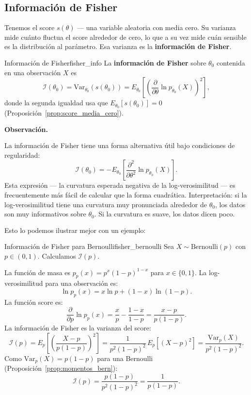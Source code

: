 \documentclass[12pt, a4paper]{book}
\newenvironment{observacion}{%
    \par\medskip\noindent\textbf{\color{azul}Observaci\'{o}n.}\enspace\itshape
}{\par\medskip}
\numberwithin{equation}{chapter}
\begin{document}
\subsection{Informaci\'{o}n de Fisher}

Tenemos el score $s(\theta)$ --- una variable aleatoria
con media cero. Su varianza mide cu\'{a}nto fluctua el
score alrededor de cero, lo que a su vez mide cu\'{a}n
sensible es la distribuci\'{o}n al par\'{a}metro. Esa
varianza es la \textbf{informaci\'{o}n de Fisher}.

\begin{definicion}{Informaci\'{o}n de Fisher}{fisher_info}
	La \textbf{informaci\'{o}n de Fisher} sobre $\theta_0$
	contenida en una observaci\'{o}n $X$ es
	\[
	\mathcal{I}(\theta_0) =
	\mathrm{Var}_{\theta_0}(s(\theta_0))
	= E_{\theta_0}\!\left[
	\left(\frac{\partial}{\partial\theta}
	\ln p_{\theta_0}(X)\right)^2\right],
	\]
	donde la segunda igualdad usa que
	$E_{\theta_0}[s(\theta_0)] = 0$
	(Proposici\'{o}n~\ref{prop:score_media_cero}).
\end{definicion}

\begin{observacion}
	La informaci\'{o}n de Fisher tiene una forma alternativa
	\'{u}til bajo condiciones de regularidad:
	\[
	\mathcal{I}(\theta_0) = -E_{\theta_0}\!\left[
	\frac{\partial^2}{\partial\theta^2}
	\ln p_{\theta_0}(X)\right].
	\]
	Esta expresi\'{o}n --- la curvatura esperada negativa
	de la log-verosimilitud --- es frecuentemente m\'{a}s
	f\'{a}cil de calcular que la forma cuadr\'{a}tica.
	Interpretaci\'{o}n: si la log-verosimilitud tiene una
	curvatura muy pronunciada alrededor de $\theta_0$,
	los datos son muy informativos sobre $\theta_0$. Si
	la curvatura es suave, los datos dicen poco.
\end{observacion}

Esto lo podemos ilustrar mejor con un ejemplo:

\begin{ejemplo}{Informaci\'{o}n de Fisher para
		Bernoulli}{fisher_bernoulli}
	Sea $X \sim \mathrm{Bernoulli}(p)$ con $p \in (0,1)$.
	Calculamos $\mathcal{I}(p)$.
	
	La funci\'{o}n de masa es $p_p(x) = p^x(1-p)^{1-x}$
	para $x \in \{0,1\}$. La log-verosimilitud para una
	observaci\'{o}n es:
	\[
	\ln p_p(x) = x\ln p + (1-x)\ln(1-p).
	\]
	La funci\'{o}n score es:
	\[
	\frac{\partial}{\partial p}\ln p_p(x)
	= \frac{x}{p} - \frac{1-x}{1-p}
	= \frac{x - p}{p(1-p)}.
	\]
	La informaci\'{o}n de Fisher es la varianza del score:
	\[
	\mathcal{I}(p)
	= E_p\!\left[\left(\frac{X-p}{p(1-p)}\right)^2\right]
	= \frac{1}{p^2(1-p)^2}\,E_p[(X-p)^2]
	= \frac{\mathrm{Var}_p(X)}{p^2(1-p)^2}.
	\]
	Como $\mathrm{Var}_p(X) = p(1-p)$ para una Bernoulli
	(Proposici\'{o}n~\ref{prop:momentos_bern}):
	\[
	\mathcal{I}(p) = \frac{p(1-p)}{p^2(1-p)^2}
	= \frac{1}{p(1-p)}.
	\]
\end{ejemplo}
\end{document}
